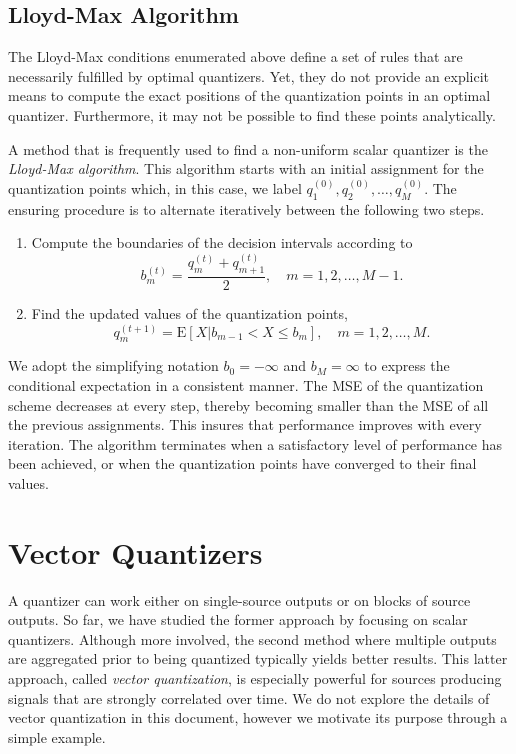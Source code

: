 \subsection{Lloyd-Max Algorithm}

The Lloyd-Max conditions enumerated above define a set of rules that are necessarily fulfilled by optimal quantizers.
Yet, they do not provide an explicit means to compute the exact positions of the quantization points in an optimal quantizer.
Furthermore, it may not be possible to find these points analytically.

A method that is frequently used to find a non-uniform scalar quantizer is the \emph{Lloyd-Max algorithm}.
This algorithm starts with an initial assignment for the quantization points which, in this case, we label $q_1^{(0)}, q_2^{(0)}, \ldots, q_M^{(0)}$.
The ensuring procedure is to alternate iteratively between the following two steps.
\begin{enumerate}
\item Compute the boundaries of the decision intervals according to
\begin{equation*}
b_m^{(t)} = \frac{q_m^{(t)} + q_{m+1}^{(t)}}{2} , \quad 
m = 1, 2, \ldots, M - 1 .
\end{equation*}
\item Find the updated values of the quantization points,
\begin{equation*}
q_m^{(t+1)} = \mathrm{E} [X | b_{m-1} < X \leq b_m ] , \quad
m = 1, 2, \ldots, M .
\end{equation*}
\end{enumerate}
We adopt the simplifying notation $b_0 = - \infty$ and $b_M = \infty$ to express the conditional expectation in a consistent manner.
The MSE of the quantization scheme decreases at every step, thereby becoming smaller than the MSE of all the previous assignments.
This insures that performance improves with every iteration.
The algorithm terminates when a satisfactory level of performance has been achieved, or when the quantization points have converged to their final values.


\section{Vector Quantizers}

A quantizer can work either on single-source outputs or on blocks of source outputs.
So far, we have studied the former approach by focusing on scalar quantizers.
Although more involved, the second method where multiple outputs are aggregated prior to being quantized typically yields better results.
This latter approach, called \emph{vector quantization}, is especially powerful for sources producing signals that are strongly correlated over time.
We do not explore the details of vector quantization in this document, however we motivate its purpose through a simple example.

